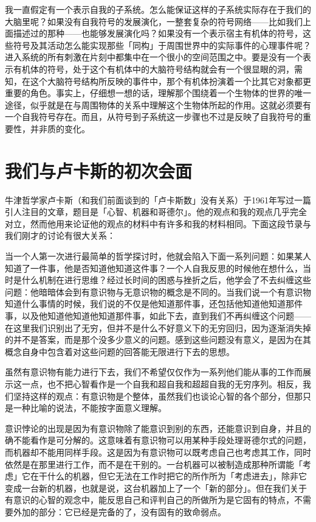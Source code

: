 \documentclass[
  12pt,
  twoside,
  openright,
  oldfontcommands,
]{memoir}
\newenvironment{fsquote}{%
  \begin{mdframed}[style=gebquote]\kaitifamily\small%
}{%
  \end{mdframed}%
}
\begin{document}
我一直假定有一个表示自我的子系统。怎么能保证这样的子系统实际存在于我们的大脑里呢？如果没有自我符号的发展演化，一整套复杂的符号网络------比如我们上面描述过的那种------也能够发展演化吗？如果没有一个表示宿主有机体的符号，这些符号及其活动怎么能实现那些「同构」于周围世界中的实际事件的心理事件呢？进入系统的所有刺激在片刻中都集中在一个很小的空间范围之中。要是没有一个表示有机体的符号，处于这个有机体中的大脑符号结构就会有一个很显眼的洞，需知，在这个大脑符号结构所反映的事件中，那个有机体扮演着一个比其它对象都更重要的角色。事实上，仔细想一想的话，理解那个围绕着一个生物体的世界的唯一途径，似乎就是在与周围物体的关系中理解这个生物体所起的作用。这就必须要有一个自我符号存在。而且，从符号到子系统这一步骤也不过是反映了自我符号的重要性，并非质的变化。

\section{我们与卢卡斯的初次会面}

牛津哲学家卢卡斯（和我们前面谈到的「卢卡斯数」没有关系）于1961年写过一篇引人注目的文章，题目是「心智、机器和哥德尔」。他的观点和我的观点几乎完全对立，然而他用来论证他的观点的材料中有许多和我的材料相同。下面这段节录与我们刚才的讨论有很大关系：

\begin{fsquote}
当一个人第一次进行最简单的哲学探讨时，他就会陷入下面一系列问题：如果某人知道了一件事，他是否知道他知道这件事？一个人自我反思的时候他在想什么，当时是什么机制在进行思维？经过长时间的困惑与挫折之后，他学会了不去纠缠这些问题：他暗暗体会到有意识物与无意识物的概念是不同的。当我们说一个有意识物知道什么事情的时候，我们说的不仅是他知道那件事，还包括他知道他知道那件事，以及他知道他知道他知道那件事，如此下去，直到我们不再纠缠这个问题------在这里我们识别出了无穷，但并不是什么不好意义下的无穷回归，因为逐渐消失掉的并不是答案，而是那个没多少意义的问题。感到这些问题没有意义，是因为在其概念自身中包含着对这些问题的回答能无限进行下去的思想。
\end{fsquote}

\begin{fsquote}
虽然有意识物有能力进行下去，我们不希望仅仅作为一系列他们能从事的工作而展示这一点，也不把心智看作是一个自我和超自我和超超自我的无穷序列。相反，我们坚持这样的观点：有意识物是个整体，虽然我们也谈论心智的各个部分，但那只是一种比喻的说法，不能按字面意义理解。
\end{fsquote}

\begin{fsquote}
意识悖论的出现是因为有意识物除了能意识到别的东西，还能意识到自身，并且的确不能看作是可分解的。这意味着有意识物可以用某种手段处理哥德尔式的问题，而机器却不能用同样手段。这是因为有意识物可以既考虑自己也考虑其工作，同时依然是在那里进行工作，而不是在干别的。一台机器可以被制造成那种所谓能「考虑」它在干什么的机器，但它无法在工作时把它的所作所为「考虑进去」，除非它变成一台新的机器，也就是说，这台机器加上了一个「新的部分」。但在我们关于有意识的心智的观念中，能反思自己和评判自己的所做所为是它固有的特点，不需要外加的部分：它已经是完备的了，没有固有的致命弱点。
\end{fsquote}
\end{document}
